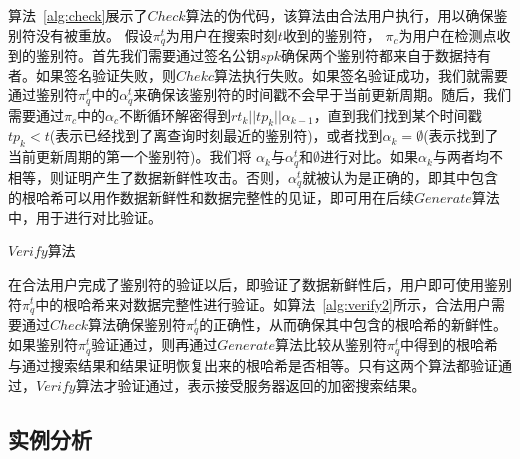 算法~\ref{alg:check}展示了$Check$算法的伪代码，该算法由合法用户执行，用以确保鉴别符没有被重放。
假设$\pi^t_q$为用户在搜索时刻$t$收到的鉴别符， $\pi_c$为用户在检测点收到的鉴别符。首先我们需要通过签名公钥$spk$确保两个鉴别符都来自于数据持有者。如果签名验证失败，则$Chekc$算法执行失败。如果签名验证成功，我们就需要通过鉴别符$\pi^t_q$中的$\alpha^t_q$来确保该鉴别符的时间戳不会早于当前更新周期。随后，我们需要通过$\pi_c$中的$\alpha_c$不断循环解密得到$rt_k||tp_k||\alpha_{k-1}$，直到我们找到某个时间戳$tp_k < t$(表示已经找到了离查询时刻最近的鉴别符)，或者找到$\alpha_k = \emptyset$(表示找到了当前更新周期的第一个鉴别符)。我们将 $\alpha_k$与$\alpha^t_q$和$\emptyset$进行对比。如果$\alpha_k$与两者均不相等，则证明产生了数据新鲜性攻击。否则，$\alpha^t_q$就被认为是正确的，即其中包含的根哈希可以用作数据新鲜性和数据完整性的见证，即可用在后续$Generate$算法中，用于进行对比验证。

\begin{algorithm}[t]
  \caption{$Verify$算法}
  \label{alg:verify2}
  \begin{algorithmic}[1]

  \end{algorithmic}
\end{algorithm}

在合法用户完成了鉴别符的验证以后，即验证了数据新鲜性后，用户即可使用鉴别符$\pi^t_q$中的根哈希来对数据完整性进行验证。如算法~\ref{alg:verify2}所示，合法用户需要通过$Check$算法确保鉴别符$\pi^t_q$的正确性，从而确保其中包含的根哈希的新鲜性。如果鉴别符$\pi^t_q$验证通过，则再通过$Generate$算法比较从鉴别符$\pi^t_q$中得到的根哈希与通过搜索结果和结果证明恢复出来的根哈希是否相等。只有这两个算法都验证通过，$Verify$算法才验证通过，表示接受服务器返回的加密搜索结果。



\subsection{实例分析}

